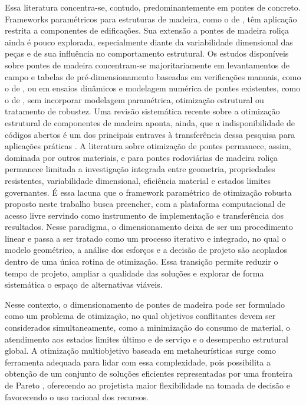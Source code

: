 Essa literatura concentra-se, contudo, predominantemente em pontes de concreto.
Frameworks paramétricos para estruturas de madeira, como o de \textcite{Jiang2023}, têm aplicação restrita a componentes de edificações.
Sua extensão a pontes de madeira roliça ainda é pouco explorada, especialmente diante da variabilidade dimensional das peças e de sua influência no comportamento estrutural.
Os estudos disponíveis sobre pontes de madeira concentram-se majoritariamente em levantamentos de campo e tabelas de pré-dimensionamento baseadas em verificações manuais, como o de \textcite{Criado2024}, ou em ensaios dinâmicos e modelagem numérica de pontes existentes, como o de \textcite{BERGENUDD2023115429}, sem incorporar modelagem paramétrica, otimização estrutural ou tratamento de robustez.
Uma revisão sistemática recente sobre a otimização estrutural de componentes de madeira aponta, ainda, que a indisponibilidade de códigos abertos é um dos principais entraves à transferência dessa pesquisa para aplicações práticas \parencite{Belz2025}.
A literatura sobre otimização de pontes permanece, assim, dominada por outros materiais, e para pontes rodoviárias de madeira roliça permanece limitada a investigação integrada entre geometria, propriedades resistentes, variabilidade dimensional, eficiência material e estados limites governantes.
É essa lacuna que o framework paramétrico de otimização robusta proposto neste trabalho busca preencher, com a plataforma computacional de acesso livre servindo como instrumento de implementação e transferência dos resultados.
Nesse paradigma, o dimensionamento deixa de ser um procedimento linear e passa a ser tratado como um processo iterativo e integrado, no qual o modelo geométrico, a análise dos esforços e a decisão de projeto são acoplados dentro de uma única rotina de otimização.
Essa transição permite reduzir o tempo de projeto, ampliar a qualidade das soluções e explorar de forma sistemática o espaço de alternativas viáveis.

Nesse contexto, o dimensionamento de pontes de madeira pode ser formulado como um problema de otimização, no qual objetivos conflitantes devem ser considerados simultaneamente, como a minimização do consumo de material, o atendimento aos estados limites último e de serviço e o desempenho estrutural global.
A otimização multiobjetivo baseada em metaheurísticas surge como ferramenta adequada para lidar com essa complexidade, pois possibilita a obtenção de um conjunto de soluções eficientes representadas por uma fronteira de Pareto \parencite{DEB2009}, oferecendo ao projetista maior flexibilidade na tomada de decisão e favorecendo o uso racional dos recursos.

